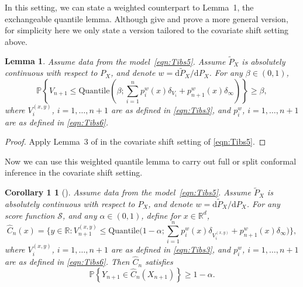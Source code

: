 \documentclass[10.5pt, letterpaper]{article}
\numberwithin{table}{section}
\numberwithin{figure}{section}
\numberwithin{equation}{section}
\newtheorem{lemma}{Lemma}
\newtheorem*{corollary1}{Corollary 1}
\begin{document}
In this setting, we can state a weighted counterpart to Lemma~1, the exchangeable quantile lemma.
Although \cite{tibshirani2019conformal} give and prove a more general version, for simplicity here we only state a version tailored to the covariate shift setting above.

\setcounter{lemma}{1}
\begin{lemma}\label{lem:weightedquantile}
Assume data from the model~\eqref{eqn:Tibs5}.
Assume $\tilde{P}_X$ is absolutely continuous with respect to ${P}_X$, and denote $w = \mathrm{d}\tilde{P}_X/\mathrm{d}P_X$.
For any $\beta\in(0,1)$,
\[\mathbb{P}\left\{ V_{n+1} \leq \mathrm{Quantile}\left(
\beta; \sum_{i=1}^n p_i^w(x) \delta_{V_i} + p_{n+1}^w(x) \delta_\infty
\right) \right\} \geq \beta,\]
where $V_i^{(x,y)}$, $i=1,\ldots,n+1$ are as defined in \eqref{eqn:Tibs3}, and $p_i^w$, $i=1,\ldots,n+1$ are as defined in \eqref{eqn:Tibs6}.
\end{lemma}
\begin{proof}
Apply Lemma~3 of \cite{tibshirani2019conformal} in the covariate shift setting of \eqref{eqn:Tibs5}.
\end{proof}

Now we can use this weighted quantile lemma to carry out full or split conformal inference in the covariate shift setting.

\begin{corollary1}[\cite{tibshirani2019conformal}]
Assume data from the model~\eqref{eqn:Tibs5}.
Assume $\tilde{P}_X$ is absolutely continuous with respect to ${P}_X$, and denote $w = \mathrm{d}\tilde{P}_X/\mathrm{d}P_X$.
For any score function $\mathcal{S}$, and any $\alpha\in(0,1)$, define for $x \in \mathbb{R}^d$,
\begin{equation*}\label{eqn:Tibs7}
\hat{C}_n(x) = \biggl\{ y\in\mathbb{R}:V_{n+1}^{(x,y)} \leq \mathrm{Quantile} \biggl( 1-\alpha; \sum_{i=1}^n p_i^w(x) \delta_{V_i^{(x,y)}} + p_{n+1}^w(x) \delta_\infty \biggr) \biggr\},
\end{equation*}
where $V_i^{(x,y)}$, $i=1,\ldots,n+1$ are as defined in \eqref{eqn:Tibs3}, and $p_i^w$, $i=1,\ldots,n+1$ are as defined in \eqref{eqn:Tibs6}.
Then $\hat{C}_n$ satisfies
\[\mathbb{P}\left\{ Y_{n+1} \in \hat{C}_n(X_{n+1})\right\} \geq 1-\alpha.\]
\end{corollary1}
\end{document}
